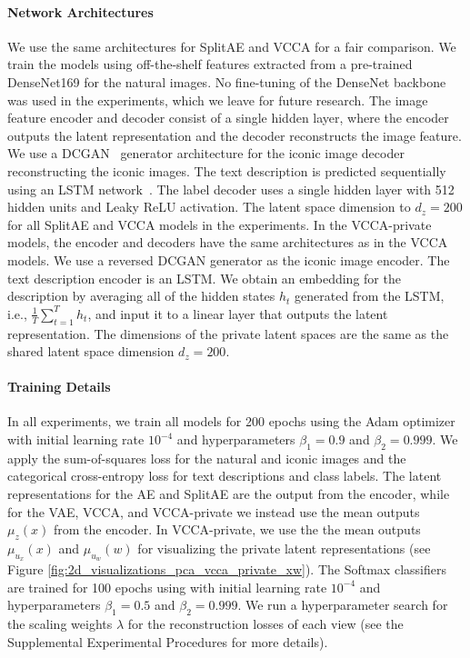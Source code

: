 \paragraph{Network Architectures} We use the same architectures for SplitAE and VCCA for a fair comparison. We train the models using off-the-shelf features extracted from a pre-trained DenseNet169 for the natural images. No fine-tuning of the DenseNet backbone was used in the experiments, which we leave for future research. The image feature encoder and decoder consist of a single hidden layer, where the encoder outputs the latent representation and the decoder reconstructs the image feature. We use a DCGAN~ generator architecture for the iconic image decoder reconstructing the iconic images. The text description is predicted sequentially using an LSTM network~. The label decoder uses a single hidden layer with 512 hidden units and Leaky ReLU activation. 
The latent space dimension to $d_{z} = 200$ for all SplitAE and VCCA models in the experiments. In the VCCA-private models, the encoder and decoders have the same architectures as in the VCCA models. We use a reversed DCGAN generator as the iconic image encoder. The text description encoder is an LSTM. We obtain an embedding for the description by averaging all of the hidden states $h_t$ generated from the LSTM, i.e., $\frac{1}{T} \sum_{t=1}^{T} h_t$, and input it to a linear layer that outputs the latent representation. The dimensions of the private latent spaces are the same as the shared latent space dimension $d_{z} = 200$. 

\paragraph{Training Details} In all experiments, we train all models for 200 epochs using the Adam optimizer~ with initial learning rate $10^{-4}$ and hyperparameters $\beta_1 = 0.9$ and $\beta_2 = 0.999$. We apply the sum-of-squares loss for the natural and iconic images and the categorical cross-entropy loss for text descriptions and class labels. The latent representations for the AE and SplitAE are the output from the encoder, while for the VAE, VCCA, and VCCA-private we instead use the mean outputs $\mu_{z}(x)$ from the encoder. In VCCA-private, we use the the mean outputs $\mu_{u_{x}}(x)$ and $\mu_{u_{w}}(w)$ for visualizing the private latent representations (see Figure \ref{fig:2d_visualizations_pca_vcca_private_xw}). The Softmax classifiers are trained for 100 epochs using with initial learning rate $10^{-4}$ and hyperparameters $\beta_1 = 0.5$ and $\beta_2 = 0.999$. We run a hyperparameter search for the scaling weights $\lambda$ for the reconstruction losses of each view (see the Supplemental Experimental Procedures
for more details). 

